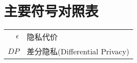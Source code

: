 \chapter{主要符号对照表}
\label{chap:symb}

\begin{longtable}{rl}
$\epsilon$     & 隐私代价 \\
$DP$ 		& 差分隐私(Differential Privacy) \\

\end{longtable}
